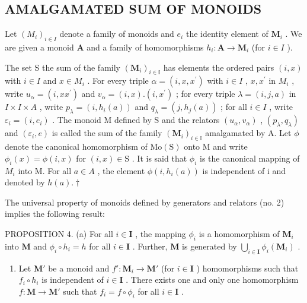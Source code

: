 \subsection{AMALGAMATED SUM OF MONOIDS}

Let \((M_{i})_{i\in I}\) denote a family of monoids and \(e_i\) the identity element of \(\mathbf{M}_i\) . We are given a monoid \(\mathbf{A}\) and a family of homomorphisms \(h_i\colon \mathbf{A}\to \mathbf{M}_i\) (for \(i\in I\) ).

The set S the sum of the family \((\mathbf{M}_{i})_{i\in\mathbb{I}}\) has elements the ordered pairs \((i,x)\) with \(i\in I\) and \(x\in M_{i}\) . For every triple \(\alpha=(i,x,x^{\prime})\) with \(i\in I\) , \(x,x^{\prime}\) in \(M_{i}\) , write \(u_{\alpha}=(i,xx^{\prime})\) and \(v_{\alpha}=(i,x).(i,x^{\prime})\) ; for every triple \(\lambda=(i,j,a)\) in \(I\times I\times A\) , write \(p_{\lambda}=(i,h_{i}(a))\) and \(q_{\lambda}=(j,h_{j}(a))\) ; for all \(i\in I\) , write \(\varepsilon_{i}=(i,e_{i})\) . The monoid M defined by S and the relators \((u_{\alpha},v_{\alpha})\) , \((p_{\lambda},q_{\lambda})\) and \((\varepsilon_{i},e)\) is called the sum of the family \((\mathbf{M}_{i})_{i\in\mathbb{I}}\) amalgamated by A. Let \(\phi\) denote the canonical homomorphism of \(\mathrm{Mo}(\mathrm{S})\) onto M and write \(\phi_{i}(x)=\phi(i,x)\) for \((i,x)\in\mathrm{S}\) . It is said that \(\phi_{i}\) is the canonical mapping of \(M_{i}\) into M. For all \(a\in A\) , the element \(\phi(i,h_{i}(a))\) is independent of i and denoted by \(h(a).†\)

The universal property of monoids defined by generators and relators (no. 2) implies the following result:

PROPOSITION 4. (a) For all \(i \in \mathbf{I}\) , the mapping \(\phi_i\) is a homomorphism of \(\mathbf{M}_i\) into \(\mathbf{M}\) and \(\phi_i \circ h_i = h\) for all \(i \in \mathbf{I}\) . Further, \(\mathbf{M}\) is generated by \(\bigcup_{i \in \mathbf{I}} \phi_i(\mathbf{M}_i)\) .

\begin{enumerate}
\def\labelenumi{(\alph{enumi})}
\setcounter{enumi}{1}
\tightlist
\item
  Let \(\mathbf{M}'\) be a monoid and \(f': \mathbf{M}_i \to \mathbf{M}'\) (for \(i \in \mathbf{I}\) ) homomorphisms such that \(f_i \circ h_i\) is independent of \(i \in \mathbf{I}\) . There exists one and only one homomorphism \(f: \mathbf{M} \to \mathbf{M}'\) such that \(f_i = f \circ \phi_i\) for all \(i \in \mathbf{I}\) .
\end{enumerate}

